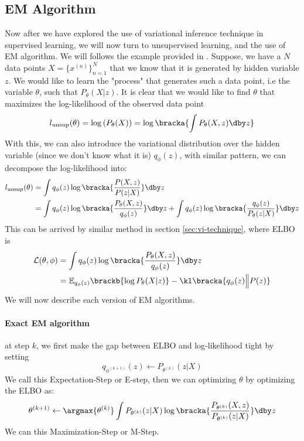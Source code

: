 \subsection{EM Algorithm}
Now after we have explored the use of variational inference technique in supervised learning, we will now turn to unsupervised learning, and the use of EM algorithm. We will follows the example provided in \cite{fellows2019virel}. Suppose, we have a $N$ data points $X = \{x^{(n)}\}^N_{n=1}$ that we know that it is generated by hidden variable $z$. We would like to learn the "process" that generates such a data point, i.e the variable $\theta$, such that $P_{\theta}(X | z)$. It is clear that we would like to find $\theta$ that maximizes the log-likelihood of the observed data point
\begin{equation}
    l_{\text{unsup}}(\theta) = \log \left( P_{\theta}(X) \right) = \log\bracka {\int P_{\theta}(X, z) \dby z}
\end{equation}
With this, we can also introduce the variational distribution over the hidden variable (since we don't know what it is) $q_{\phi}(z)$, with similar pattern, we can decompose the log-likelihood into:
\begin{equation}
    \begin{aligned}
        l_{\text{unsup}}(\theta) &= \int q_{\phi}(z) \log \bracka{\frac{P(X, z)}{P(z | X)}} \dby z \\
        &= \int q_{\phi}(z) \log \bracka{\frac{P_{\theta}(X, z)}{q_{\phi}(z)}} \dby z + \int q_{\phi}(z) \log \bracka{\frac{q_{\phi}(z)}{P_{\theta}(z | X)}} \dby z
    \end{aligned}
\end{equation}
This can be arrived by similar method in section \ref{sec:vi-technique}, where ELBO is 
\begin{equation}
    \begin{aligned}
        \mathcal{L}(\theta, \phi) &= \int q_{\phi}(z) \log \bracka{\frac{P_{\theta}(X, z)}{q_{\phi}(z)}} \dby z \\
        &= \mathbb{E}_{q_{\phi}(z)} \brackb{\log P_{\theta}(X | z)} - \kl\bracka{q_{\phi}(z) \Big\| P(z)}
    \end{aligned}
\end{equation}
We will now describe each version of EM algorithms.
\paragraph{Exact EM algorithm} at step $k$, we first make the gap between ELBO and log-likelihood tight by setting 
\begin{equation}
    q_{\phi^{(k+1)}}(z) \leftarrow P_{\theta^{(k)}}(z | X)
\end{equation}
We call this Expectation-Step or E-step, then we can optimizing $\theta$ by optimizing the ELBO as:
\begin{equation}
    \theta^{(k+1)} \leftarrow \argmax{\theta^{(k)}}  \int P_{\theta^{(k)}}(z | X) \log \bracka{\frac{P_{\theta^{(k)}}(X, z)}{P_{\theta^{(k)}}(z | X)}} \dby z 
\end{equation}
We can this Maximization-Step or M-Step.

